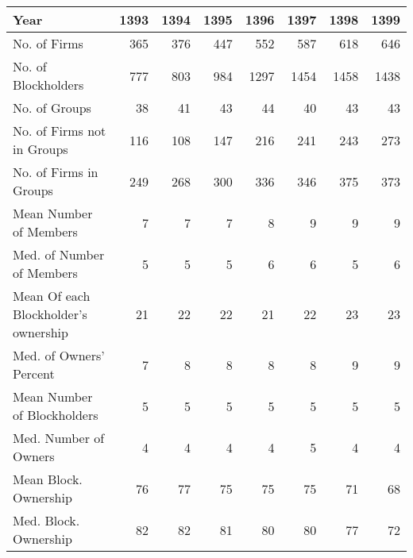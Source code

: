 \begin{tabular}{lrrrrrrr}
\toprule
Year &  1393 &  1394 &  1395 &  1396 &  1397 &  1398 &  1399 \\
\midrule
No. of Firms                         &   365 &   376 &   447 &   552 &   587 &   618 &   646 \\
No. of Blockholders                  &   777 &   803 &   984 &  1297 &  1454 &  1458 &  1438 \\
No. of Groups                        &    38 &    41 &    43 &    44 &    40 &    43 &    43 \\
No. of Firms not in Groups           &   116 &   108 &   147 &   216 &   241 &   243 &   273 \\
No. of Firms in Groups               &   249 &   268 &   300 &   336 &   346 &   375 &   373 \\
Mean Number of Members               &     7 &     7 &     7 &     8 &     9 &     9 &     9 \\
Med. of  Number of Members           &     5 &     5 &     5 &     6 &     6 &     5 &     6 \\
Mean Of each Blockholder’s ownership &    21 &    22 &    22 &    21 &    22 &    23 &    23 \\
Med. of Owners' Percent              &     7 &     8 &     8 &     8 &     8 &     9 &     9 \\
Mean Number of Blockholders          &     5 &     5 &     5 &     5 &     5 &     5 &     5 \\
Med. Number of Owners                &     4 &     4 &     4 &     4 &     5 &     4 &     4 \\
Mean Block. Ownership                &    76 &    77 &    75 &    75 &    75 &    71 &    68 \\
Med. Block. Ownership                &    82 &    82 &    81 &    80 &    80 &    77 &    72 \\
\bottomrule
\end{tabular}

